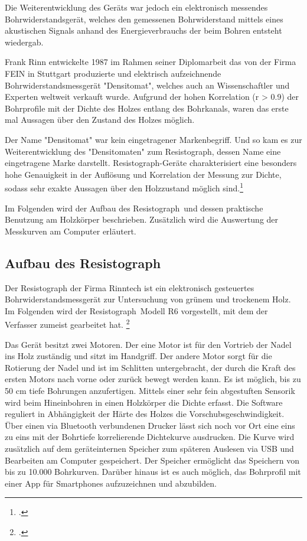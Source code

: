 \documentclass[a4paper, halfparskip]{article}
\def\SymbReg{\textsuperscript{\textregistered}}
\begin{document}
Die Weiterentwicklung des Geräts war jedoch ein elektronisch messendes
Bohrwiderstandsgerät, welches den gemessenen Bohrwiderstand mittels eines
akustischen Signals anhand des Energieverbrauchs der beim Bohren entsteht
wiedergab.

Frank Rinn entwickelte 1987 im Rahmen seiner Diplomarbeit das von der Firma
FEIN in Stuttgart produzierte und elektrisch aufzeichnende
Bohrwiderstandsmessgerät "Densitomat", welches auch an Wissenschaftler und
Experten weltweit verkauft wurde. Aufgrund der hohen Korrelation (r
\textgreater{} 0.9) der Bohrprofile mit der Dichte des Holzes entlang des
Bohrkanals, waren das erste mal Aussagen über den Zustand des Holzes möglich.

Der Name "Densitomat" war kein eingetragener Markenbegriff. Und so kam es zur
Weiterentwicklung des "Densitomaten" zum Resistograph\SymbReg, dessen Name
eine eingetragene Marke darstellt. Resistograph\SymbReg-Geräte charakterisiert
eine besonders hohe Genauigkeit in der Auflösung und Korrelation der Messung
zur Dichte, sodass sehr exakte Aussagen über den Holzzustand möglich
sind.\footcite{rinn:resi_drill_transition}

Im Folgenden wird der Aufbau des Resistograph\SymbReg\ und dessen praktische
Benutzung am Holzkörper beschrieben. Zusätzlich wird die Auswertung der
Messkurven am Computer erläutert. 

\subsection{Aufbau des Resistograph\SymbReg}
Der Resistograph der Firma Rinntech ist ein elektronisch gesteuertes
Bohrwiderstandsmessgerät zur Untersuchung von grünem und trockenem Holz. Im
Folgenden wird der Resistograph\SymbReg\ Modell R6 vorgestellt, mit dem der
Verfasser zumeist gearbeitet hat.
\footcite{rinn:risserkennung}

Das Gerät besitzt zwei Motoren. Der eine Motor ist für den Vortrieb der Nadel
ins Holz zuständig und sitzt im Handgriff. Der andere Motor sorgt für die
Rotierung der Nadel und ist im Schlitten untergebracht, der durch die Kraft
des ersten Motors nach vorne oder zurück bewegt werden kann. Es ist möglich,
bis zu 50 cm tiefe Bohrungen anzufertigen. Mittels einer sehr fein abgestuften
Sensorik wird beim Hineinbohren in einen Holzkörper die Dichte erfasst. Die
Software reguliert in Abhängigkeit der Härte des Holzes die
Vorschubsgeschwindigkeit. Über einen via Bluetooth verbundenen Drucker lässt
sich noch vor Ort eine eins zu eins mit der Bohrtiefe korrelierende
Dichtekurve ausdrucken. Die Kurve wird zusätzlich auf dem geräteinternen
Speicher zum späteren Auslesen via USB und Bearbeiten am Computer gespeichert.
Der Speicher ermöglicht das Speichern von bis zu 10.000 Bohrkurven. Darüber
hinaus ist es auch möglich, das Bohrprofil mit einer App für Smartphones
aufzuzeichnen und abzubilden.
\end{document}
